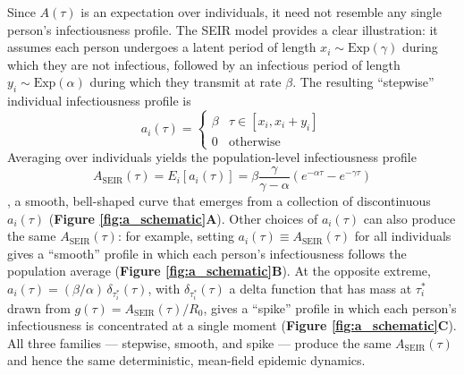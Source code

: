 

Since $A(\tau)$ is an expectation over individuals, it need not resemble any single person's infectiousness profile. The SEIR model provides a clear illustration: it assumes each person undergoes a latent period of length $x_i \sim \text{Exp}(\gamma)$ during which they are not infectious, followed by an infectious period of length $y_i \sim \text{Exp}(\alpha)$ during which they transmit at rate $\beta$. The resulting ``stepwise'' individual infectiousness profile is
%
\begin{equation}
a_i(\tau) = \begin{cases}
    \beta & \tau \in [x_i, x_i + y_i] \\
    0 & \text{otherwise}
\end{cases}
\label{eq:a_seir_stepwise}
\end{equation}
%
Averaging over individuals yields the population-level infectiousness profile
%
\begin{equation}
A_\text{SEIR}(\tau) = E_i[a_i(\tau)] = \beta \frac{\gamma}{\gamma - \alpha}(e^{-\alpha \tau} - e^{-\gamma \tau})
\label{eq:A_seir}
\end{equation}
% 
\ie, a smooth, bell-shaped curve that emerges from a collection of discontinuous $a_i(\tau)$ ({\bf Figure \ref{fig:a_schematic}A}). Other choices of $a_i(\tau)$ can also produce the same $A_\text{SEIR}(\tau)$: for example, setting $a_i(\tau) \equiv A_\text{SEIR}(\tau)$ for all individuals gives a ``smooth'' profile in which each person's infectiousness follows the population average ({\bf Figure \ref{fig:a_schematic}B}). At the opposite extreme, $a_i(\tau) = (\beta/\alpha)\,\delta_{\tau_i^*}(\tau)$, with $\delta_{\tau_i^*}(\tau)$ a delta function that has mass at $\tau_i^*$ drawn from $g(\tau) = A_\text{SEIR}(\tau)/R_0$, gives a ``spike'' profile in which each person's infectiousness is concentrated at a single moment ({\bf Figure \ref{fig:a_schematic}C}). All three families --- stepwise, smooth, and spike --- produce the same $A_\text{SEIR}(\tau)$ and hence the same deterministic, mean-field epidemic dynamics.   

